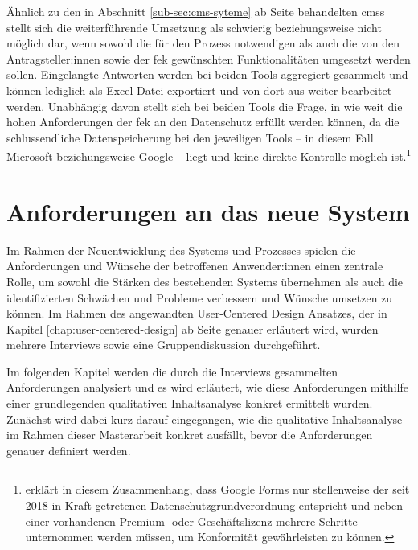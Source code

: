 \documentclass[a4paper,12pt,twoside]{scrreprt}
\begin{document}
Ähnlich zu den in Abschnitt \ref{sub-sec:cms-syteme} ab Seite \pageref{sub-sec:cms-syteme} behandelten \aclp{cms} stellt sich die weiterführende Umsetzung als schwierig beziehungsweise nicht möglich dar, wenn sowohl die für den Prozess notwendigen als auch die von den Antragsteller:innen sowie der \ac{fek} gewünschten Funktionalitäten umgesetzt werden sollen. Eingelangte Antworten werden bei beiden Tools aggregiert gesammelt und können lediglich als Excel-Datei exportiert und von dort aus weiter bearbeitet werden. \cite{microsoft_corporation_wie_2021, google_ireland_limited_ergebnisse_2023} Unabhängig davon stellt sich bei beiden Tools die Frage, in wie weit die hohen Anforderungen der \acl{fek} an den Datenschutz erfüllt werden können, da die schlussendliche Datenspeicherung bei den jeweiligen Tools -- in diesem Fall Microsoft beziehungsweise Google -- liegt und keine direkte Kontrolle möglich ist.\footnote{\cite{visitor_analytics_gmbh_ist_2022} erklärt in diesem Zusammenhang, dass Google Forms nur stellenweise der seit 2018 in Kraft getretenen Datenschutzgrundverordnung entspricht und neben einer vorhandenen Premium- oder Geschäftslizenz mehrere Schritte unternommen werden müssen, um Konformität gewährleisten zu können.}

\cleardoublepage
\chapter{Anforderungen an das neue System}
\label{chap:anforderung-neues-system}

Im Rahmen der Neuentwicklung des Systems und Prozesses spielen die Anforderungen und Wünsche der betroffenen Anwender:innen einen zentrale Rolle, um sowohl die Stärken des bestehenden Systems übernehmen als auch die identifizierten Schwächen und Probleme verbessern und Wünsche umsetzen zu können. Im Rahmen des angewandten User-Centered Design Ansatzes, der in Kapitel \ref{chap:user-centered-design} ab Seite \pageref{chap:user-centered-design} genauer erläutert wird, wurden mehrere Interviews sowie eine Gruppendiskussion durchgeführt.

Im folgenden Kapitel werden die durch die Interviews gesammelten Anforderungen analysiert und es wird erläutert, wie diese Anforderungen mithilfe einer grundlegenden qualitativen Inhaltsanalyse konkret ermittelt wurden. Zunächst wird dabei kurz darauf eingegangen, wie die qualitative Inhaltsanalyse im Rahmen dieser Masterarbeit konkret ausfällt, bevor die Anforderungen genauer definiert werden.
\end{document}
